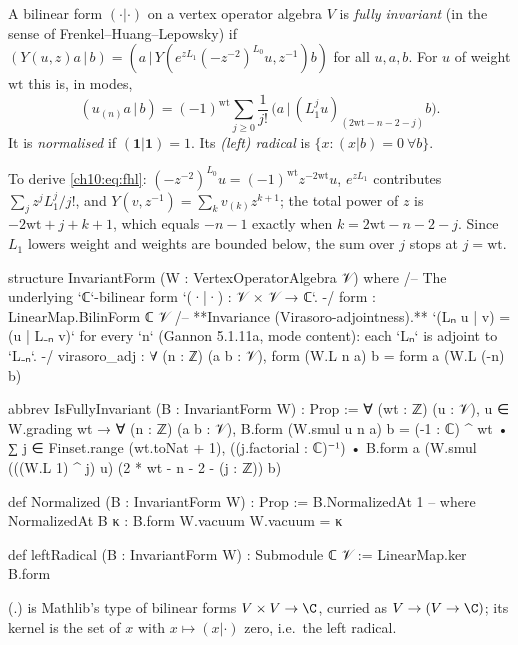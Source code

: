\begin{definition}\label{ch10:def:invform}
A bilinear form $(\cdot|\cdot)$ on a vertex operator algebra $V$ is \emph{fully invariant} (in the
sense of Frenkel--Huang--Lepowsky) if
$(Y(u,z)a\,|\,b)=(a\,|\,Y(e^{zL_1}(-z^{-2})^{L_0}u,z^{-1})b)$ for all $u,a,b$.  For $u$ of weight
$\mathrm{wt}$ this is, in modes,
\begin{equation}\label{ch10:eq:fhl}
  (u_{(n)}a\,|\,b)=(-1)^{\mathrm{wt}}\sum_{j\ge0}\frac1{j!}\,
  \bigl(a\,\big|\,(L_1^ju)_{(2\mathrm{wt}-n-2-j)}b\bigr).
\end{equation}
It is \emph{normalised} if $(\mathbf1|\mathbf1)=1$.  Its \emph{(left) radical} is
$\{x:(x|b)=0\ \forall b\}$.
\end{definition}

To derive \eqref{ch10:eq:fhl}: $(-z^{-2})^{L_0}u=(-1)^{\mathrm{wt}}z^{-2\mathrm{wt}}u$,
$e^{zL_1}$ contributes $\sum_j z^jL_1^j/j!$, and $Y(v,z^{-1})=\sum_k v_{(k)}z^{k+1}$; the total power
of $z$ is $-2\mathrm{wt}+j+k+1$, which equals $-n-1$ exactly when $k=2\mathrm{wt}-n-2-j$.  Since
$L_1$ lowers weight and weights are bounded below, the sum over $j$ stops at $j=\mathrm{wt}$.

\begin{leancode}
structure InvariantForm (W : VertexOperatorAlgebra 𝒱) where
  /-- The underlying `ℂ`-bilinear form `(·|·) : 𝒱 × 𝒱 → ℂ`. -/
  form : LinearMap.BilinForm ℂ 𝒱
  /-- **Invariance (Virasoro-adjointness).** `(Lₙ u | v) = (u | L₋ₙ v)` for every `n`
  (Gannon 5.1.11a, mode content): each `Lₙ` is adjoint to `L₋ₙ`. -/
  virasoro_adj : ∀ (n : ℤ) (a b : 𝒱), form (W.L n a) b = form a (W.L (-n) b)

abbrev IsFullyInvariant (B : InvariantForm W) : Prop :=
  ∀ (wt : ℤ) (u : 𝒱), u ∈ W.grading wt → ∀ (n : ℤ) (a b : 𝒱),
    B.form (W.smul u n a) b
      = (-1 : ℂ) ^ wt • ∑ j ∈ Finset.range (wt.toNat + 1), ((j.factorial : ℂ)⁻¹) •
          B.form a (W.smul (((W.L 1) ^ j) u) (2 * wt - n - 2 - (j : ℤ)) b)

def Normalized (B : InvariantForm W) : Prop := B.NormalizedAt 1
-- where  NormalizedAt B κ :  B.form W.vacuum W.vacuum = κ

def leftRadical (B : InvariantForm W) : Submodule ℂ 𝒱 := LinearMap.ker B.form
\end{leancode}
(.)   is Mathlib's type of
bilinear forms $V\times V\to\C$, curried as $V\to(V\to\C)$; its kernel is the set of $x$ with
$x\mapsto(x|\cdot)$ zero, i.e.\ the left radical.

